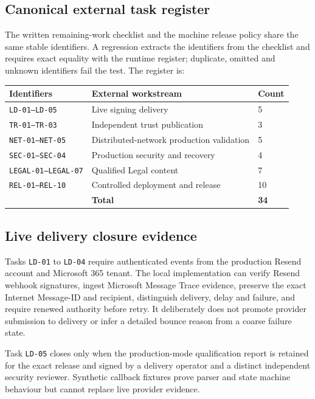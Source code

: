 \subsection{Canonical external task register}

The written remaining-work checklist and the machine release policy share the same
stable identifiers.  A regression extracts the identifiers from the checklist and
requires exact equality with the runtime register; duplicate, omitted and unknown
identifiers fail the test.  The register is:

\begin{center}
\begin{tabular}{lll}
\hline
\textbf{Identifiers} & \textbf{External workstream} & \textbf{Count} \\
\hline
\texttt{LD-01--LD-05} & Live signing delivery & 5 \\
\texttt{TR-01--TR-03} & Independent trust publication & 3 \\
\texttt{NET-01--NET-05} & Distributed-network production validation & 5 \\
\texttt{SEC-01--SEC-04} & Production security and recovery & 4 \\
\texttt{LEGAL-01--LEGAL-07} & Qualified Legal content & 7 \\
\texttt{REL-01--REL-10} & Controlled deployment and release & 10 \\
\hline
& \textbf{Total} & \textbf{34} \\
\hline
\end{tabular}
\end{center}

\subsection{Live delivery closure evidence}

Tasks \texttt{LD-01} to \texttt{LD-04} require authenticated events from the
production Resend account and Microsoft 365 tenant.  The local implementation can
verify Resend webhook signatures, ingest Microsoft Message Trace evidence, preserve
the exact Internet Message-ID and recipient, distinguish delivery, delay and
failure, and require renewed authority before retry.  It deliberately does not
promote provider submission to delivery or infer a detailed bounce reason from a
coarse failure state.

Task \texttt{LD-05} closes only when the production-mode qualification report is
retained for the exact release and signed by a delivery operator and a distinct
independent security reviewer.  Synthetic callback fixtures prove parser and state
machine behaviour but cannot replace live provider evidence.

